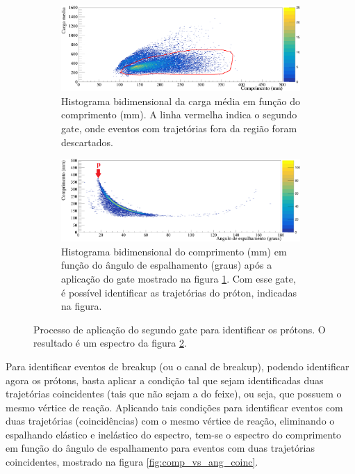 \documentclass[a4paper,12pt,oneside]{book}
\begin{document}
\begin{figure}[H]
\centering
    \begin{subfigure}[b]{\textwidth}
        \centering
        \includegraphics[scale = 0.5, width=\columnwidth]{figs/carga_media_vs_comp_cut1.png}
        \caption{Histograma bidimensional da carga média em função do comprimento (mm). A linha vermelha indica o segundo gate, onde eventos com trajetórias fora da região foram descartados.}
        \label{subfig:gate2_antes}
    \end{subfigure}%
    \hfill
    \begin{subfigure}[b]{\textwidth}
        \centering
        \includegraphics[scale=0.5, width=\columnwidth]{figs/comp_vs_ang_n2_cut12.png}
        \caption{Histograma bidimensional do comprimento (mm) em função do ângulo de espalhamento (graus) após a aplicação do gate mostrado na figura \ref{subfig:gate2_antes}. Com esse gate, é possível identificar as trajetórias do próton, indicadas na figura.}
        \label{subfig:gate2_depois}
    \end{subfigure}%
	\hfill
\caption{Processo de aplicação do segundo gate para identificar os prótons. O resultado é um espectro da figura \ref{subfig:gate2_depois}.}
\label{fig:gate_2}
\end{figure}

\par Para identificar eventos de breakup (ou o canal de breakup), podendo identificar agora os prótons, basta aplicar a condição tal que sejam identificadas duas trajetórias coincidentes (tais que não sejam a do feixe), ou seja, que possuem o mesmo vértice de reação. Aplicando tais condições para identificar eventos com duas trajetórias (coincidências) com o mesmo vértice de reação, eliminando o espalhando elástico e inelástico do espectro, tem-se o espectro do comprimento em função do ângulo de espalhamento para eventos com duas trajetórias coincidentes, mostrado na figura \ref{fig:comp_vs_ang_coinc}.
\end{document}
